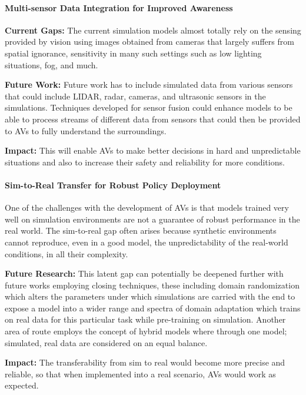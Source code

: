 \documentclass[lettersize,journal]{IEEEtran}
\begin{document}
\paragraph{Multi-sensor Data Integration for Improved Awareness}

\textbf{Current Gaps:} The current simulation models almost totally rely on the sensing provided by vision using images obtained from cameras that largely suffers from spatial ignorance, sensitivity in many such settings such as low lighting situations, fog, and much.

\textbf{Future Work:} Future work has to include simulated data from various sensors that could include LIDAR, radar, cameras, and ultrasonic sensors in the simulations. Techniques developed for sensor fusion could enhance models to be able to process streams of different data from sensors that could then be provided to AVs to fully understand the surroundings.

\textbf{Impact:} This will enable AVs to make better decisions in hard and unpredictable situations and also to increase their safety and reliability for more conditions.

\paragraph{Sim-to-Real Transfer for Robust Policy Deployment}

One of the challenges with the development of AVs is that models trained very well on simulation environments are not a guarantee of robust performance in the real world. The sim-to-real gap often arises because synthetic environments cannot reproduce, even in a good model, the unpredictability of the real-world conditions, in all their complexity.

\textbf{Future Research:} This latent gap can potentially be deepened further with future works employing closing techniques, these including domain randomization which alters the parameters under which simulations are carried with the end to expose a model into a wider range and spectra of domain adaptation which trains on real data for this particular task while pre-training on simulation. Another area of route employs the concept of hybrid models where through one model; simulated, real data are considered on an equal balance.

\textbf{Impact:} The transferability from sim to real would become more precise and reliable, so that when implemented into a real scenario, AVs would work as expected.
\end{document}
